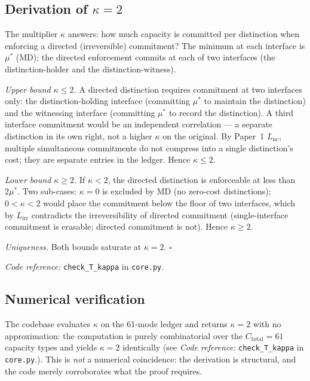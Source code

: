 \documentclass[11pt]{article}
\theoremstyle{remark}
\newcommand{\coderef}[2]{\smallskip\noindent\textit{Code reference:} \texttt{#1} in \texttt{#2}.}
\begin{document}
\subsection{Derivation of $\kappa = 2$}

The multiplier $\kappa$ answers: how much capacity is committed per
distinction when enforcing a directed (irreversible) commitment?  The
minimum at each interface is $\mu^*$ (MD); the directed enforcement commits
at each of two interfaces (the distinction-holder and the
distinction-witness).

\textit{Upper bound $\kappa \le 2$.}  A directed distinction requires
commitment at two interfaces only: the distinction-holding interface
(committing $\mu^*$ to maintain the distinction) and the witnessing
interface (committing $\mu^*$ to record the distinction).  A third
interface commitment would be an independent correlation --- a separate
distinction in its own right, not a higher $\kappa$ on the original.  By
Paper~1 $L_{\mathrm{nc}}$, multiple simultaneous commitments do not
compress into a single distinction's cost; they are separate entries in
the ledger.  Hence $\kappa \le 2$.

\textit{Lower bound $\kappa \ge 2$.}  If $\kappa < 2$, the directed
distinction is enforceable at less than $2\mu^*$.  Two sub-cases: $\kappa = 0$
is excluded by MD (no zero-cost distinctions); $0 < \kappa < 2$ would place
the commitment below the floor of two interfaces, which by
$L_{\mathrm{irr}}$ contradicts the irreversibility of directed commitment
(single-interface commitment is erasable; directed commitment is not).
Hence $\kappa \ge 2$.

\textit{Uniqueness.}  Both bounds saturate at $\kappa = 2$.  \hfill$\square$

\coderef{check\_T\_kappa}{core.py}

\subsection{Numerical verification}

The codebase evaluates $\kappa$ on the 61-mode ledger and returns
$\kappa = 2$ with no approximation: the computation is purely combinatorial
over the $C_{\mathrm{total}} = 61$ capacity types and yields
$\kappa = 2$ identically (see \coderef{check\_T\_kappa}{core.py}).  This is
\emph{not} a numerical coincidence: the derivation is structural, and the
code merely corroborates what the proof requires.


\end{document}
